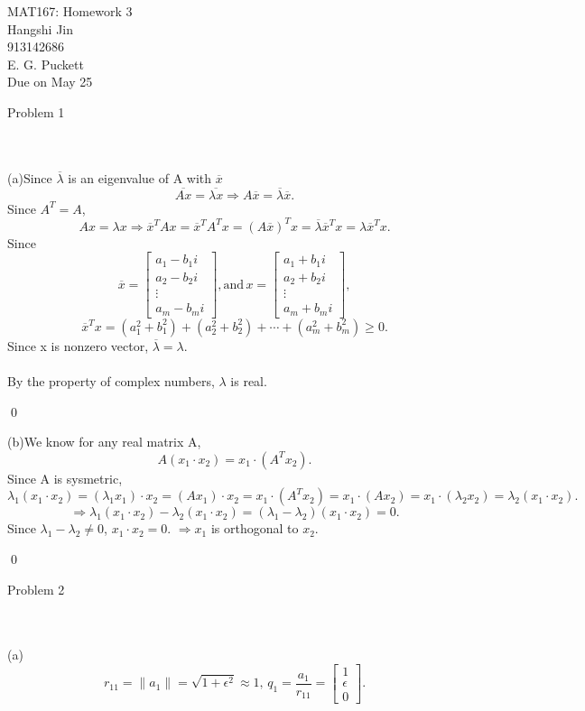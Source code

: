 \documentclass{article}
\begin{document}
\begin{flushright}MAT167: Homework 3\\ Hangshi Jin \\913142686\\ E. G. Puckett\\Due on May 25
\end{flushright}
\begin{large}Problem 1\end{large}
\\\\(a)Since $\overline{\lambda}$ is an eigenvalue of A with $\overline{x}$\[\overline{Ax}=\overline{\lambda x}\Rightarrow A\overline{x}=\overline{\lambda}\overline{x}.\]
Since $A^T=A$,
\[Ax=\lambda x\Rightarrow \overline{x}^TAx=\overline{x}^TA^Tx=(A\overline{x})^Tx=\overline{\lambda}\overline{x}^Tx=\lambda\overline{x}^T x.\]
Since \[\overline{x}=\begin{bmatrix}a_1-b_1i\\a_2-b_2i\\\vdots\\a_m-b_mi\end{bmatrix},\text{and}\,x=\begin{bmatrix}a_1+b_1i\\a_2+b_2i\\\vdots\\a_m+b_mi\end{bmatrix},\]
\[\overline{x}^T x=(a_1^2+b_1^2)+(a_2^2+b_2^2)+\cdots+(a_m^2+b_m^2)\geq0.\]
Since x is nonzero vector, $\overline{\lambda}=\lambda.$
\\\\By the property of complex numbers, $\lambda$ is real.
\begin{flushright}\qed\end{flushright}
(b)We know for any real matrix A, \[A(x_1\cdot x_2)=x_1\cdot(A^Tx_2).\]
Since A is sysmetric, \[\lambda_1(x_1\cdot x_2)=(\lambda_1x_1)\cdot x_2=(Ax_1)\cdot x_2=x_1\cdot(A^Tx_2)=x_1\cdot(Ax_2)=x_1\cdot(\lambda_2x_2)=\lambda_2(x_1\cdot x_2).\]
\[\Rightarrow\lambda_1(x_1\cdot x_2)-\lambda_2(x_1\cdot x_2)=(\lambda_1-\lambda_2)(x_1\cdot x_2)=0.\]
Since $\lambda_1-\lambda_2\neq0$, $x_1\cdot x_2=0$.
$\Rightarrow x_1$ is orthogonal to $x_2$.
\begin{flushright}\qed\end{flushright}
\begin{large}Problem 2\end{large}
\\\\(a)\[r_{11}=\lVert a_1\rVert=\sqrt{1+\epsilon^2}\approx1,\,q_1=\frac{a_1}{r_{11}}=\begin{bmatrix}1\\\epsilon\\0\end{bmatrix}.\]
\end{document}
